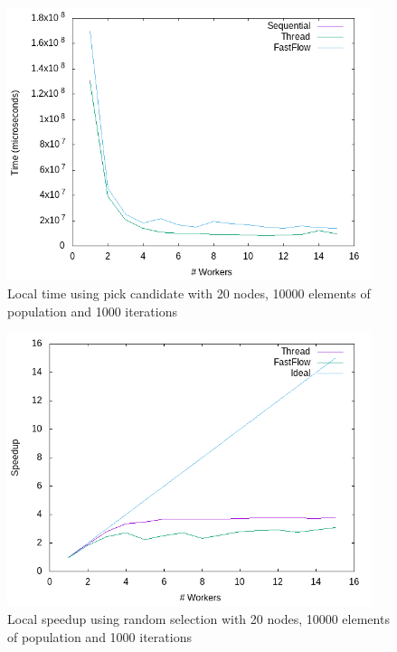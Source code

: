 \documentclass{article}
\begin{document}
    \begin{figure}
        \includegraphics[width=\linewidth,height=8cm]{img/local_t_pick.png}
        \caption{Local time using pick candidate with 20 nodes, 10000 elements of population and 1000 iterations}
        \label{fig:local_time}
    \end{figure}

    \begin{figure}
        \includegraphics[width=\linewidth,height=8cm]{img/local_s_rand.png}
        \caption{Local speedup using random selection with 20 nodes, 10000 elements of population and 1000 iterations}
        \label{fig:local_speedup}
    \end{figure}
\end{document}
